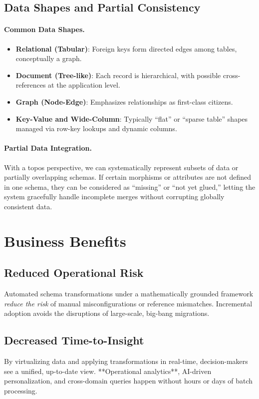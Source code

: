 \documentclass[11pt]{article}
\begin{document}
\subsection{Data Shapes and Partial Consistency}
\paragraph{Common Data Shapes.}
\begin{itemize}
\item \textbf{Relational (Tabular)}: Foreign keys form directed edges among tables, conceptually a graph.
\item \textbf{Document (Tree-like)}: Each record is hierarchical, with possible cross-references at the application level.
\item \textbf{Graph (Node-Edge)}: Emphasizes relationships as first-class citizens.
\item \textbf{Key-Value and Wide-Column}: Typically “flat” or “sparse table” shapes managed via row-key lookups and dynamic columns.
\end{itemize}

\paragraph{Partial Data Integration.}
With a topos perspective, we can systematically represent subsets of data or partially overlapping schemas. If certain morphisms or attributes are not defined in one schema, they can be considered as “missing” or “not yet glued,” letting the system gracefully handle incomplete merges without corrupting globally consistent data.

\section{Business Benefits}

\subsection{Reduced Operational Risk}
Automated schema transformations under a mathematically grounded framework \emph{reduce the risk} of manual misconfigurations or reference mismatches. Incremental adoption avoids the disruptions of large-scale, big-bang migrations.

\subsection{Decreased Time-to-Insight}
By virtualizing data and applying transformations in real-time, decision-makers see a unified, up-to-date view. **Operational analytics**, AI-driven personalization, and cross-domain queries happen without hours or days of batch processing.
\end{document}
